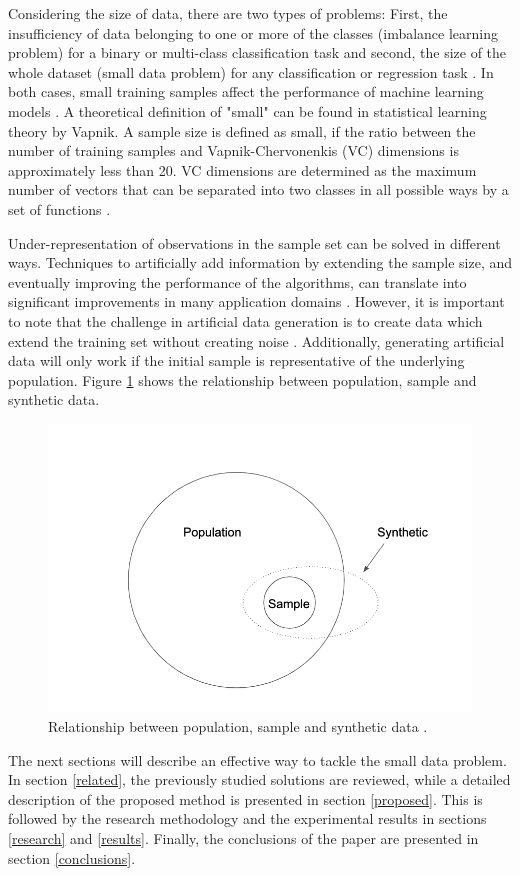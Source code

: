 \documentclass[parskip=full]{scrartcl}
\begin{document}
Considering the size of data, there are two types of problems: First, the insufficiency of data belonging to one or more of the classes (imbalance learning problem) for a binary or multi-class classification task and second, the size of the whole dataset (small data problem) for any classification or regression task \cite{Sezer.2014}. In both cases, small training samples affect the performance of machine learning models \cite{Tsai.2008}. A theoretical definition of "small" can be found in statistical learning theory by Vapnik. A sample size is defined as small, if the ratio between the number of training samples and Vapnik-Chervonenkis (VC) dimensions is approximately less than 20. VC dimensions are determined as the maximum number of vectors that can be separated into two classes in all possible ways by a set of functions \cite{Vapnik.2008}.

Under-representation of observations in the sample set can be solved in different ways. Techniques to artificially add information by extending the sample size, and eventually improving the performance of the algorithms, can translate into significant improvements in many application domains \cite{Sezer.2014}. However, it is important to note that the challenge in artificial data generation is to create data which extend the training set without creating noise \cite{Li.2006}. Additionally, generating artificial data will only work if the initial sample is representative of the underlying population. Figure \ref{fig:relationship} shows the relationship between population, sample and synthetic data.

\begin{figure}[H]
	\centering
	\includegraphics[width=0.60\linewidth]{../analysis/relationship.png}
	\caption{Relationship between population, sample and synthetic data \cite{Li.2006}.}
	\label{fig:relationship}
\end{figure}

The next sections will describe an effective way to tackle the small data
problem. In section \ref{related}, the previously studied solutions are reviewed, while a detailed description of the proposed method is presented in section \ref{proposed}. This is followed by the research methodology and the experimental results in sections \ref{research} and \ref{results}. Finally, the conclusions of the paper are presented in section \ref{conclusions}.
\end{document}
